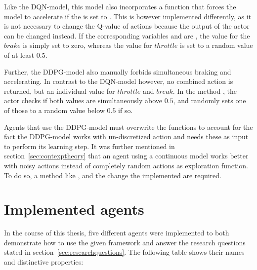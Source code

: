 Like the DQN-model, this model also incorporates a function that forces the model to accelerate if the  is set to . This is however implemented differently, as it is not necessary to change the Q-value of actions because the output of the actor can be changed instead. If the corresponding variables  and  are , the value for the $brake$ is simply set to zero, whereas the value for $throttle$ is set to a random value of at least $0.5$. 

Further, the DDPG-model also manually forbids simultaneous braking and accelerating. In contrast to the DQN-model however, no combined action is returned, but an individual value for $throttle$ and $break$. In the method , the actor checks if both values are simultaneously above $0.5$, and randomly sets one of those to a random value below $0.5$ if so.

Agents that use the DDPG-model must overwrite the functions  to account for the fact the DDPG-model works with un-discretized action and needs these as input to perform its learning step. 
It was further mentioned in section~\ref{sec:contexptheory} that an agent using a continuous model works better with noisy actions instead of completely random actions as exploration function. To do so, a method like , and the change the implemented  are required.

\section{Implemented agents}

In the course of this thesis, five different agents were implemented to both demonstrate how to use the given framework and answer the research questions stated in section~\ref{sec:researchquestions}.  The following table shows their names and distinctive properties: 

